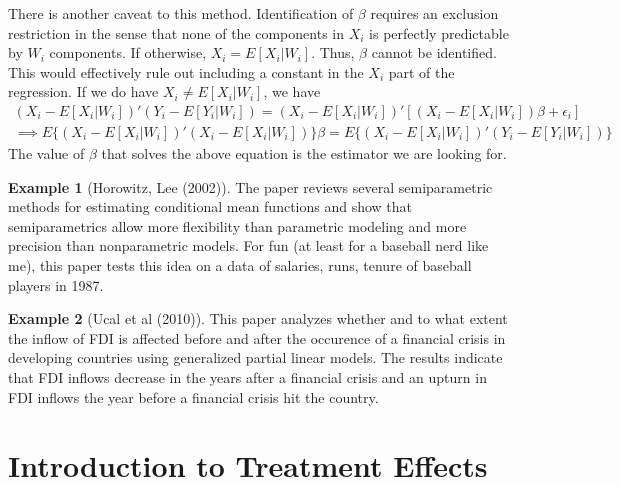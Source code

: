 \documentclass[12pt]{article}
\theoremstyle{definition}
\theoremstyle{property}
\theoremstyle{assumption}
\theoremstyle{example}
\newtheorem{example}{Example}[section]
\theoremstyle{comment}
\begin{document}
There is another caveat to this method. Identification of $\beta$ requires an exclusion restriction in the sense that none of the components in $X_i$ is perfectly predictable by $W_i$ components. If otherwise, $X_i=E[X_i|W_i]$. Thus, $\beta$ cannot be identified. This would effectively rule out including a constant in the $X_i$ part of the regression. If we do have $X_i\neq E[X_i|W_i]$, we have
\begin{gather*}
(X_i-E[X_i|W_i])'(Y_i-E[Y_i|W_i])=(X_i-E[X_i|W_i])'[(X_i-E[X_i|W_i])\beta+\epsilon_i]\\
\implies E\{(X_i-E[X_i|W_i])'(X_i-E[X_i|W_i])\}\beta=E\{(X_i-E[X_i|W_i])'(Y_i-E[Y_i|W_i])\}
\end{gather*}
The value of $\beta$ that solves the above equation is the estimator we are looking for. 
\begin{mdframed}[backgroundcolor=yellow!5] 
\begin{example}[Horowitz, Lee (2002)] The paper reviews several semiparametric methods for estimating conditional mean functions and show that semiparametrics allow more flexibility than parametric modeling and more precision than nonparametric models. For fun (at least for a baseball nerd like me), this paper tests this idea on a data of salaries, runs, tenure of baseball players in 1987. 
\end{example}
\begin{example}[Ucal et al (2010)] This paper analyzes whether and to what extent the inflow of FDI is affected before and after the occurence of a financial crisis in developing countries using generalized partial linear models. The results indicate that FDI inflows decrease in the years after a financial crisis and an upturn in FDI inflows the year before a financial crisis hit the country.
\end{example}
\end{mdframed}

\section{Introduction to Treatment Effects}
\end{document}
